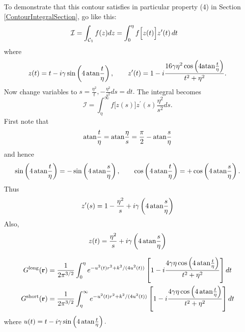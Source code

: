 \documentclass[letterpaper]{article}
\begin{document}
To demonstrate that this contour satisfies in particular 
property (4) in Section \ref{ContourIntegralSection}, go like 
this:
\begin{align*}
\mathcal{I}=
\int_{\mathcal{C}_1} f(z) dz
 &=\int_{0}^\eta
       f\Big[ z(t) \Big] 
       z^\prime(t) \, dt
\end{align*}
where 
$$ z(t)=t-i\gamma\sin\left(4\,\text{atan} \frac{t}{\eta}\right), 
   \qquad
   z^\prime(t)
   =
   1 - i\frac{16\gamma\eta^2 \cos\left(4\text{atan}\frac{t}{\eta}\right)}
                      {t^2 + \eta^2}.
$$
Now change variables to $s=\frac{\eta^2}{t}, -\frac{\eta^2}{s^2}ds=dt.$
The integral becomes
$$\mathcal{I}
  = 
  \int_\eta^\infty f\Big[z(s)\Big] z^\prime(s) \frac{\eta^2}{s^2}ds.
$$
First note that 
$$ \text{atan}\frac{t}{\eta} = \text{atan}\frac{\eta}{s} 
   = \frac{\pi}{2}-\text{atan}\frac{s}{\eta}$$
and hence
$$
 \sin\left(4\,\text{atan}\frac{t}{\eta} \right)
= - \sin\left(4\,\text{atan}\frac{s}{\eta}\right), 
\qquad 
 \cos\left(4\,\text{atan}\frac{t}{\eta} \right)
= + \cos\left(4\,\text{atan}\frac{s}{\eta}\right).
$$
Thus 
$$ z^\prime(s) 
   = 
   1 - \frac{\eta^2}{s} + i\gamma\left(4\,\text{atan}\frac{s}{\eta}\right)
$$
Also,
$$ z(t) = \frac{\eta^2}{s} + i\gamma\left(4\,\text{atan}\frac{s}{\eta}\right)$$

\begin{align*}
 G^{\hbox{\scriptsize{long}}}(\mathbf{r}) 
&=\frac{1}{2\pi^{3/2}} 
  \int_0^\eta e^{-u^2(t) r^2 + k^2/(4u^2(t))}
  \left[ 1 - i\frac{4 \gamma \eta \cos\left(4\, \text{atan} \frac{t}{\eta}\right)}
                   {t^2 + \eta^2}
  \right] dt
\\
 G^{\hbox{\scriptsize{short}}}(\mathbf{r}) 
&=\frac{1}{2\pi^{3/2}} 
  \int_\eta^\infty e^{-u^2(t) r^2 + k^2/(4u^2(t))}
  \left[ 1 - i\frac{4 \gamma \eta \cos\left(4\, \text{atan} \frac{t}{\eta}\right)}
                   {t^2 + \eta^2}
  \right] dt
\end{align*}
where $u(t)=t-i\gamma\sin\left(4\,\text{atan}\frac{t}{\eta}\right).$

\newpage
\end{document}
